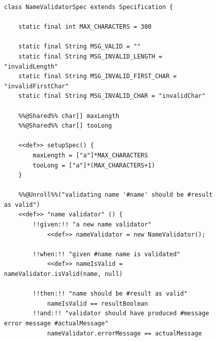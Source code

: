     \begin{figure}[H]
        \begin{lstlisting}[style=javatiny]
class NameValidatorSpec extends Specification {

    static final int MAX_CHARACTERS = 300

    static final String MSG_VALID = ""
    static final String MSG_INVALID_LENGTH = "invalidLength"
    static final String MSG_INVALID_FIRST_CHAR = "invalidFirstChar"
    static final String MSG_INVALID_CHAR = "invalidChar"

    %%@Shared%% char[] maxLength
    %%@Shared%% char[] tooLong

    <<def>> setupSpec() {
        maxLength = ["a"]*MAX_CHARACTERS
        tooLong = ["a"]*(MAX_CHARACTERS+1)
    }

    %%@Unroll%%("validating name '#name' should be #result as valid")
    <<def>> "name validator" () {
        !!given:!! "a new name validator"
            <<def>> nameValidator = new NameValidator();

        !!when:!! "given #name name is validated"
            <<def>> nameIsValid = nameValidator.isValid(name, null)

        !!then:!! "name should be #result as valid"
            nameIsValid == resultBoolean
        !!and:!! "validator should have produced #message error message #actualMessage"
            nameValidator.errorMessage == actualMessage


\end{lstlisting}
\end{figure}
